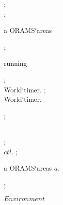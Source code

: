 \begin{thread}
\begin{blockstmt}
 ; \\
 ; \\
\begin{setfor}{a}{ \Rng ORAMS`areas}
\end{setfor} ; \\
\begin{while}{running}
\begin{blockstmt}
 ; \\
World`timer. ; \\
World`timer.
\end{blockstmt}
\end{while} ; \\
\begin{defstmt}
\end{defstmt} \\
\Skip  ; \\
$ctl$. ; \\
\begin{setfor}{a}{ \Rng ORAMS`areas}
$a$.
\end{setfor} ; \\
\end{blockstmt}
\end{thread}
\kEnd $Environment$

